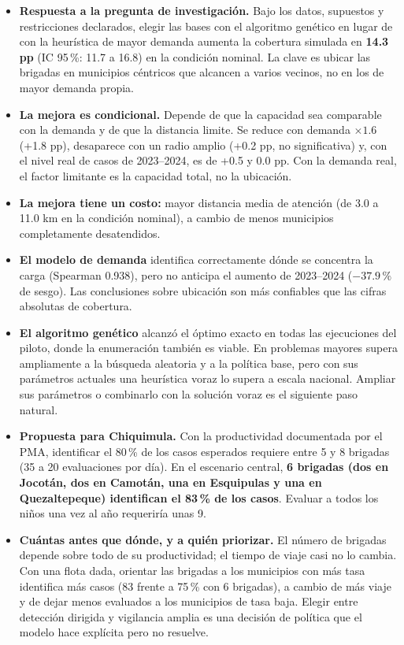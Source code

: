 \documentclass[11pt,letterpaper]{article}
\begin{document}
\begin{itemize}
  \item \textbf{Respuesta a la pregunta de investigación.} Bajo los datos, supuestos y restricciones declarados, elegir las bases con el algoritmo genético en lugar de con la heurística de mayor demanda aumenta la cobertura simulada en \textbf{14.3 pp} (IC 95\,\%: 11.7 a 16.8) en la condición nominal. La clave es ubicar las brigadas en municipios céntricos que alcancen a varios vecinos, no en los de mayor demanda propia.
  \item \textbf{La mejora es condicional.} Depende de que la capacidad sea comparable con la demanda y de que la distancia limite. Se reduce con demanda $\times1.6$ (+1.8 pp), desaparece con un radio amplio (+0.2 pp, no significativa) y, con el nivel real de casos de 2023--2024, es de +0.5 y 0.0 pp. Con la demanda real, el factor limitante es la capacidad total, no la ubicación.
  \item \textbf{La mejora tiene un costo:} mayor distancia media de atención (de 3.0 a 11.0 km en la condición nominal), a cambio de menos municipios completamente desatendidos.
  \item \textbf{El modelo de demanda} identifica correctamente dónde se concentra la carga (Spearman 0.938), pero no anticipa el aumento de 2023--2024 ($-37.9\,\%$ de sesgo). Las conclusiones sobre ubicación son más confiables que las cifras absolutas de cobertura.
  \item \textbf{El algoritmo genético} alcanzó el óptimo exacto en todas las ejecuciones del piloto, donde la enumeración también es viable. En problemas mayores supera ampliamente a la búsqueda aleatoria y a la política base, pero con sus parámetros actuales una heurística voraz lo supera a escala nacional. Ampliar sus parámetros o combinarlo con la solución voraz es el siguiente paso natural.
  \item \textbf{Propuesta para Chiquimula.} Con la productividad documentada por el PMA, identificar el 80\,\% de los casos esperados requiere entre 5 y 8 brigadas (35 a 20 evaluaciones por día). En el escenario central, \textbf{6 brigadas (dos en Jocotán, dos en Camotán, una en Esquipulas y una en Quezaltepeque) identifican el 83\,\% de los casos}. Evaluar a todos los niños una vez al año requeriría unas 9.
  \item \textbf{Cuántas antes que dónde, y a quién priorizar.} El número de brigadas depende sobre todo de su productividad; el tiempo de viaje casi no lo cambia. Con una flota dada, orientar las brigadas a los municipios con más tasa identifica más casos (83 frente a 75\,\% con 6 brigadas), a cambio de más viaje y de dejar menos evaluados a los municipios de tasa baja. Elegir entre detección dirigida y vigilancia amplia es una decisión de política que el modelo hace explícita pero no resuelve.
\end{itemize}
\end{document}
